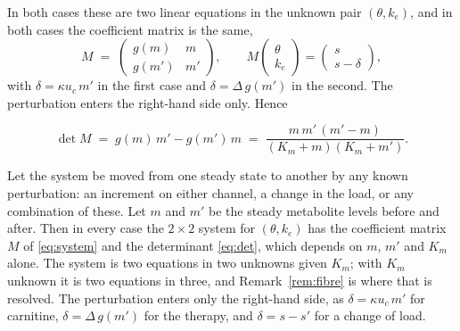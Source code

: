 In both cases these are two linear equations in the unknown pair $(\theta, k_e)$, and in
both cases the coefficient matrix is the same,
\begin{equation}
M \;=\;
\begin{pmatrix} g(m) & m \\[2pt] g(m') & m' \end{pmatrix},
\qquad
M \begin{pmatrix} \theta \\ k_e \end{pmatrix}
= \begin{pmatrix} s \\ s - \delta \end{pmatrix},
\label{eq:system}
\end{equation}
with $\delta = \kappa u_c\, m'$ in the first case and $\delta = \Delta\, g(m')$ in the
second. The perturbation enters the right-hand side only. Hence

\begin{equation}
\det M \;=\; g(m)\,m' - g(m')\,m
\;=\; \frac{m\,m'\,(m' - m)}{(K_m + m)(K_m + m')}.
\label{eq:det}
\end{equation}

\begin{proposition}
\label{prop:channel}
Let the system be moved from one steady state to another by any known perturbation: an
increment on either channel, a change in the load, or any combination of these. Let $m$ and
$m'$ be the steady metabolite levels before and after. Then in every case the
$2 \times 2$ system for $(\theta, k_e)$ has the coefficient matrix $M$ of
\eqref{eq:system} and the determinant \eqref{eq:det}, which depends on $m$, $m'$ and $K_m$
alone. The system is two equations in two unknowns given $K_m$; with $K_m$ unknown it is two
equations in three, and Remark~\ref{rem:fibre} is where that is resolved. The perturbation enters only the right-hand side, as
$\delta = \kappa u_c\, m'$ for carnitine, $\delta = \Delta\, g(m')$ for the therapy, and
$\delta = s - s'$ for a change of load.
\end{proposition}

